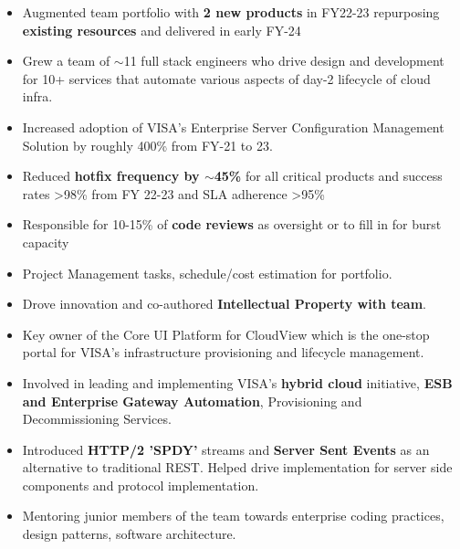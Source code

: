 \documentclass[10pt,a4paper,ragged2e,withhyper]{altacv}
\begin{document}
\begin{paracol}{2}
\begin{itemize}
  \item Augmented team portfolio with \textbf{2 new products} in FY22-23 repurposing \textbf{existing resources} and delivered in early FY-24
  \item Grew a team of \(\sim \)11 full stack engineers who drive design and development for 10+ services that automate various aspects of day-2 lifecycle of cloud infra.
  \item Increased adoption of VISA's Enterprise Server Configuration Management Solution by roughly 400\% from FY-21 to 23.
  \item Reduced \textbf{hotfix frequency by \(\sim \)45\%} for all critical products and success rates >98\% from FY 22-23 and SLA adherence >95\%
  \item Responsible for 10-15\% of \textbf{code reviews} as oversight or to fill in for burst capacity 
  \item Project Management tasks, schedule/cost estimation for portfolio.
  \item Drove innovation and co-authored \textbf{Intellectual Property with team}.
\end{itemize}

\divider

\begin{itemize}
  \item Key owner of the Core UI Platform for CloudView which is the one-stop portal for VISA’s infrastructure provisioning and lifecycle management.
  \item Involved in leading and implementing VISA’s \textbf{hybrid cloud} initiative, \textbf{ESB and Enterprise Gateway Automation}, Provisioning and Decommissioning Services.
  \item Introduced \textbf{HTTP/2 'SPDY'} streams and \textbf{Server Sent Events} as an alternative to traditional REST. Helped drive implementation for server side components and protocol implementation.
  \item Mentoring junior members of the team towards enterprise coding practices, design patterns, software architecture.
\end{itemize}

\divider


\end{paracol}
\end{document}
